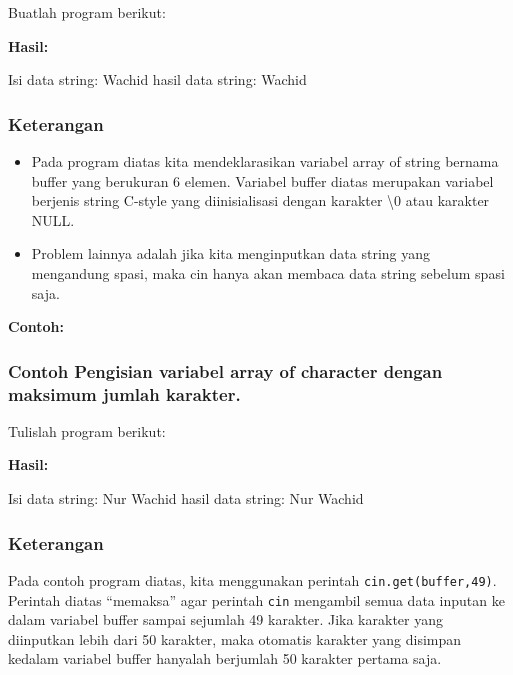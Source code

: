 {{Buatlah program berikut:



\textbf{Hasil:}
\begin{lcverbatim}
Isi data string: Wachid
hasil data string: Wachid
\end{lcverbatim}


\subsubsection*{Keterangan}

\begin{itemize}

\item
 Pada program diatas kita mendeklarasikan variabel array of string
 bernama buffer yang berukuran 6 elemen. Variabel buffer diatas
 merupakan variabel berjenis string C-style yang diinisialisasi dengan
 karakter \textbackslash{0} atau karakter NULL.
\item
 Problem lainnya adalah jika kita menginputkan data string yang
 mengandung spasi, maka cin hanya akan membaca data string sebelum
 spasi saja.
\end{itemize}

\textbf{Contoh:}



\subsubsection*{Contoh Pengisian variabel array of character dengan maksimum jumlah karakter.}

Tulislah program berikut:



\textbf{Hasil:}
\begin{lcverbatim}
Isi data string: Nur Wachid
hasil data string: Nur Wachid
\end{lcverbatim}


\subsubsection*{Keterangan}

Pada contoh program diatas, kita menggunakan perintah
\texttt{cin.get(buffer,49)}. Perintah diatas ``memaksa'' agar perintah
\texttt{cin} mengambil semua data inputan ke dalam variabel buffer
sampai sejumlah 49 karakter. Jika karakter yang diinputkan lebih dari 50
karakter, maka otomatis karakter yang disimpan kedalam variabel buffer
hanyalah berjumlah 50 karakter pertama saja.

}}
